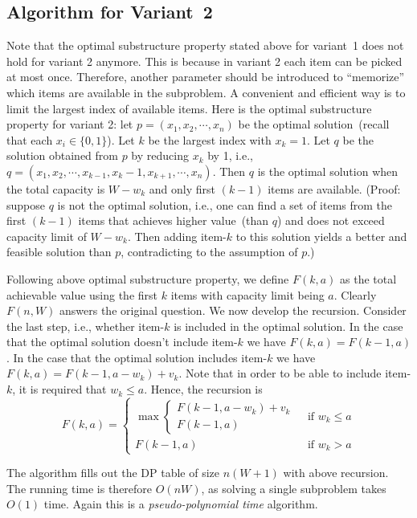 \documentclass[letterpaper,11pt]{article}
\theoremstyle{mytheorem}
\begin{document}
\subsection*{Algorithm for Variant~2}

Note that the optimal substructure property stated above for variant~1 does not hold for variant 2 anymore.
This is because in variant 2 each item can be picked at most once. Therefore, another parameter should
be introduced to ``memorize'' which items are available in the subproblem. A convenient and efficient way is to
limit the largest index of available items. Here is the optimal substructure property for variant 2:
let $p = (x_1, x_2, \cdots, x_n)$ be the optimal solution~(recall that each $x_i \in \{0,1\}$).
Let $k$ be the largest index with $x_k = 1$.
Let $q$ be the solution obtained from $p$ by
reducing $x_k$ by 1, i.e., $q = (x_1, x_2, \cdots, x_{k-1}, x_k - 1, x_{k + 1}, \cdots, x_n)$.
Then $q$ is the optimal solution when the total capacity is $W - w_k$ and only first $(k-1)$ items are available.
(Proof: suppose $q$ is not the optimal solution,
i.e., one can find a set of items from the first $(k-1)$ items that achieves higher value~(than $q$) and does not exceed capacity limit of $W - w_k$.
Then adding item-$k$ to this solution yields a better and feasible solution than $p$, contradicting to the assumption of $p$.)

Following above optimal substructure property,
we define $F(k, a)$ as the total achievable value using the first $k$ items with capacity limit being $a$.
Clearly $F(n, W)$ answers the original question.
We now develop the recursion.
Consider the last step, i.e., whether item-$k$ is included in the optimal solution.
In the case that the optimal solution doesn't include item-$k$ we have $F(k,a) = F(k-1,a)$.
In the case that the optimal solution includes item-$k$ we have $F(k,a) = F(k-1,a-w_k) + v_k$.
Note that in order to be able to include item-$k$, it is required that $w_k \le a$.
Hence, the recursion is
\begin{displaymath}
F(k,a) = 
\left\{
	\begin{array}{lllll}
	 \max \left\{
			\begin{array}{lllll}
			F(k-1,a-w_k) + v_k\\
			F(k-1,a)
			\end{array}
		\right. & \textrm{ if } w_k \le a \\
	F(k-1,a) & \textrm{ if } w_k > a
	\end{array}
\right.
\end{displaymath}

The algorithm fills out the DP table of size $n(W + 1)$
with above recursion. The running time is therefore $O(nW)$, as solving
a single subproblem takes $O(1)$ time.
Again this is a \emph{pseudo-polynomial time} algorithm. 
\end{document}
